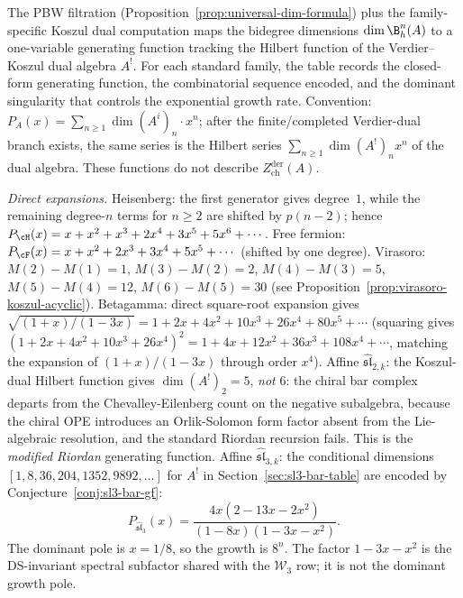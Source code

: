 \begin{computation}
\label{comp:bar-cohomology-gfs}
The PBW filtration (Proposition~\ref{prop:universal-dim-formula})
plus the family-specific Koszul dual computation maps the
bidegree dimensions $\dim \B^n_h(A)$ to a one-variable generating
function tracking the Hilbert function of the Verdier--Koszul dual
algebra $A^!$.
For each standard family, the table records the closed-form generating
function, the combinatorial sequence encoded, and the dominant
singularity that controls the exponential growth rate.
Convention: $P_A(x) = \sum_{n \geq 1} \dim(A^i)_n \cdot x^n$; after the
finite/completed Verdier-dual branch exists, the same series is the
Hilbert series $\sum_{n \geq 1}\dim(A^!)_n x^n$ of the dual algebra.
These functions do not describe $Z^{\mathrm{der}}_{\mathrm{ch}}(A)$.

\emph{Direct expansions.}
Heisenberg: the first generator gives degree~$1$, while the remaining
degree-$n$ terms for $n \geq 2$ are shifted by $p(n-2)$; hence
$P_{\cH}(x) = x + x^2 + x^3 + 2x^4 + 3x^5 + 5x^6 + \cdots$.
Free fermion: $P_{\cF}(x) = x + x^2 + 2x^3 + 3x^4 + 5x^5 + \cdots$
(shifted by one degree).
Virasoro: $M(2) - M(1) = 1$, $M(3) - M(2) = 2$, $M(4) - M(3) = 5$,
$M(5) - M(4) = 12$, $M(6) - M(5) = 30$ (see
Proposition~\ref{prop:virasoro-koszul-acyclic}).
Betagamma: direct square-root expansion gives
$\sqrt{(1+x)/(1-3x)} = 1 + 2x + 4x^2 + 10x^3 + 26x^4 + 80x^5 + \cdots$
(squaring gives $(1 + 2x + 4x^2 + 10x^3 + 26x^4)^2 =
1 + 4x + 12x^2 + 36x^3 + 108x^4 + \cdots$, matching the expansion
of $(1+x)/(1-3x)$ through order $x^4$).
Affine $\widehat{\mathfrak{sl}}_{2,k}$: the Koszul-dual Hilbert
function gives $\dim(A^!)_2 = 5$, \emph{not} $6$: the chiral bar complex
departs from the Chevalley-Eilenberg count on the negative
subalgebra, because the chiral OPE introduces an Orlik-Solomon form
factor absent from the Lie-algebraic resolution, and the standard
Riordan recursion fails.
This is the \emph{modified Riordan} generating function.
Affine $\widehat{\mathfrak{sl}}_{3,k}$: the conditional dimensions
$[1, 8, 36, 204, 1352, 9892, \ldots]$ for $A^!$ in
Section~\ref{sec:sl3-bar-table} are encoded by
Conjecture~\ref{conj:sl3-bar-gf}:
\[
P_{\widehat{\mathfrak{sl}}_3}(x)
=
\frac{4x(2-13x-2x^2)}
{(1-8x)(1-3x-x^2)}.
\]
The dominant pole is $x=1/8$, so the growth is $8^n$. The factor
$1-3x-x^2$ is the DS-invariant spectral subfactor shared with the
$\mathcal{W}_3$ row; it is not the dominant growth pole.
\end{computation}


